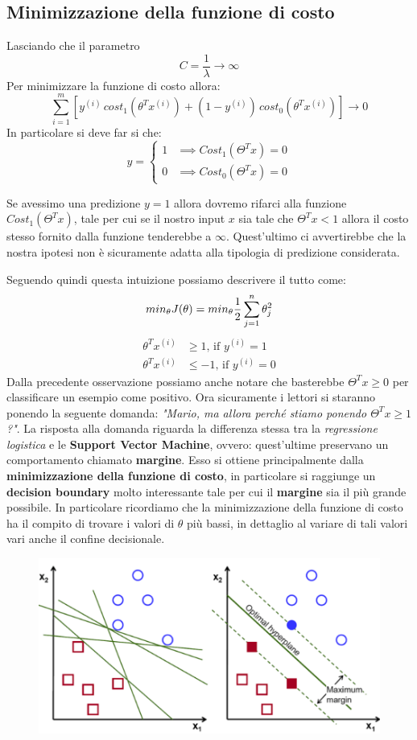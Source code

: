 \subsection{Minimizzazione della funzione di costo}
Lasciando che il parametro \[C = \frac{1}{\lambda} \to \infty\]
Per minimizzare la funzione di costo allora:
\[\sum_{i=1}^m \left[ y^{(i)}\,cost_1(\theta^T x^{(i)}) + (1-y^{(i)})\,cost_0(\theta^T x^{(i)}) \right] \to 0\]
In particolare si deve far si che:
  \[y =
    \begin{cases}
      1& \implies Cost_1(\Theta^Tx) = 0\\
      0& \implies Cost_0(\Theta^Tx) = 0 
    \end{cases}
  \]
  \begin{esempio}
Se avessimo una predizione $y=1$ allora dovremo rifarci alla funzione $Cost_1(\Theta^Tx)$, tale per cui se il nostro input $x$ sia tale che $\Theta^Tx < 1$ allora il costo stesso fornito dalla funzione tenderebbe a $\infty$. Quest'ultimo ci avvertirebbe che la nostra ipotesi non è sicuramente adatta alla tipologia di predizione considerata.
\end{esempio}
Seguendo quindi questa intuizione possiamo descrivere il tutto come:
\[min_\theta J(\theta) = min_\theta {1 \over 2 } \sum_{j=1}^n \theta_j^2\]
\begin{align*}
\theta^Tx^{(i)} &\geq 1 \text{, if } y^{(i)}=1 \\
\theta^Tx^{(i)} &\leq -1 \text{, if } y^{(i)}=0
\end{align*} %
Dalla precedente osservazione possiamo anche notare che basterebbe $\Theta^Tx \geq 0$ per classificare un esempio come positivo. Ora sicuramente i lettori si staranno ponendo la seguente domanda: \textit{"Mario, ma allora perché stiamo ponendo $\Theta^Tx \geq 1$?"}. La risposta alla domanda riguarda la differenza stessa tra la \textit{regressione logistica} e le \textbf{Support Vector Machine}, ovvero: quest'ultime preservano un comportamento chiamato \textbf{margine}. Esso si ottiene principalmente dalla \textbf{minimizzazione della funzione di costo}, in particolare si raggiunge un \textbf{decision boundary} molto interessante tale per cui il \textbf{margine} sia il più grande possibile. In particolare ricordiamo che la minimizzazione della funzione di costo ha il compito di trovare i valori di $\theta$ più bassi, in dettaglio al variare di tali valori vari anche il confine decisionale.
\begin{figure}[H]
    \centering
    \includegraphics[width=1\textwidth]{img/margin.png}
\end{figure}
